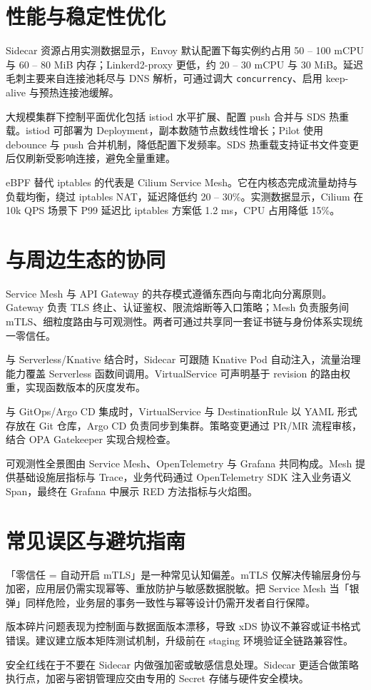 \chapter{性能与稳定性优化}
Sidecar 资源占用实测数据显示，Envoy 默认配置下每实例约占用 50 – 100 mCPU 与 60 – 80 MiB 内存；Linkerd2-proxy 更低，约 20 – 30 mCPU 与 30 MiB。延迟毛刺主要来自连接池耗尽与 DNS 解析，可通过调大 \texttt{concurrency}、启用 keep-alive 与预热连接池缓解。\par
大规模集群下控制平面优化包括 istiod 水平扩展、配置 push 合并与 SDS 热重载。istiod 可部署为 Deployment，副本数随节点数线性增长；Pilot 使用 debounce 与 push 合并机制，降低配置下发频率。SDS 热重载支持证书文件变更后仅刷新受影响连接，避免全量重建。\par
eBPF 替代 iptables 的代表是 Cilium Service Mesh。它在内核态完成流量劫持与负载均衡，绕过 iptables NAT，延迟降低约 20 – 30\%{}。实测数据显示，Cilium 在 10k QPS 场景下 P99 延迟比 iptables 方案低 1.2 ms，CPU 占用降低 15\%{}。\par
\chapter{与周边生态的协同}
Service Mesh 与 API Gateway 的共存模式遵循东西向与南北向分离原则。Gateway 负责 TLS 终止、认证鉴权、限流熔断等入口策略；Mesh 负责服务间 mTLS、细粒度路由与可观测性。两者可通过共享同一套证书链与身份体系实现统一零信任。\par
与 Serverless/Knative 结合时，Sidecar 可跟随 Knative Pod 自动注入，流量治理能力覆盖 Serverless 函数间调用。VirtualService 可声明基于 revision 的路由权重，实现函数版本的灰度发布。\par
与 GitOps/Argo CD 集成时，VirtualService 与 DestinationRule 以 YAML 形式存放在 Git 仓库，Argo CD 负责同步到集群。策略变更通过 PR/MR 流程审核，结合 OPA Gatekeeper 实现合规检查。\par
可观测性全景图由 Service Mesh、OpenTelemetry 与 Grafana 共同构成。Mesh 提供基础设施层指标与 Trace，业务代码通过 OpenTelemetry SDK 注入业务语义 Span，最终在 Grafana 中展示 RED 方法指标与火焰图。\par
\chapter{常见误区与避坑指南}
「零信任 = 自动开启 mTLS」是一种常见认知偏差。mTLS 仅解决传输层身份与加密，应用层仍需实现幂等、重放防护与敏感数据脱敏。把 Service Mesh 当「银弹」同样危险，业务层的事务一致性与幂等设计仍需开发者自行保障。\par
版本碎片问题表现为控制面与数据面版本漂移，导致 xDS 协议不兼容或证书格式错误。建议建立版本矩阵测试机制，升级前在 staging 环境验证全链路兼容性。\par
安全红线在于不要在 Sidecar 内做强加密或敏感信息处理。Sidecar 更适合做策略执行点，加密与密钥管理应交由专用的 Secret 存储与硬件安全模块。\par
